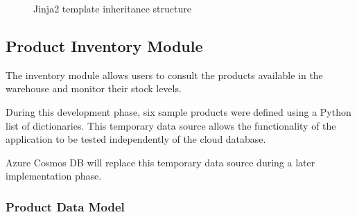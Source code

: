 \begin{figure}[htbp]
    \centering


    \caption{Jinja2 template inheritance structure}
    \label{fig:template-inheritance}

\end{figure}


\subsection{Product Inventory Module}

The inventory module allows users to consult the products
available in the warehouse and monitor their stock levels.

During this development phase, six sample products were
defined using a Python list of dictionaries. This temporary
data source allows the functionality of the application
to be tested independently of the cloud database.

Azure Cosmos DB will replace this temporary data source
during a later implementation phase.

\subsubsection{Product Data Model}

